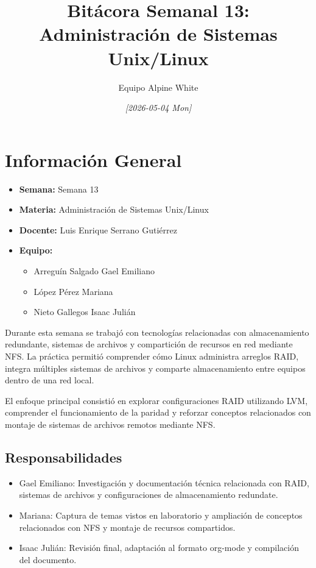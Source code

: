 \documentclass[11pt, letterpaper]{article}
\author{Equipo Alpine White}
\date{\textit{{[}2026-05-04 Mon]}}
\title{Bitácora Semanal 13: Administración de Sistemas Unix/Linux}
\begin{document}
\maketitle
\setcounter{tocdepth}{2}
\tableofcontents

\section{Información General}
\label{sec:org76c6d5e}

\begin{itemize}
\item \textbf{Semana:} Semana 13
\item \textbf{Materia:} Administración de Sistemas Unix/Linux
\item \textbf{Docente:} Luis Enrique Serrano Gutiérrez
\item \textbf{Equipo:}

\begin{itemize}
\item Arreguín Salgado Gael Emiliano
\item López Pérez Mariana
\item Nieto Gallegos Isaac Julián
\end{itemize}
\end{itemize}

Durante esta semana se trabajó con tecnologías relacionadas con almacenamiento redundante, sistemas de archivos y compartición de recursos en red mediante NFS. La práctica permitió comprender cómo Linux administra arreglos RAID, integra múltiples sistemas de archivos y comparte almacenamiento entre equipos dentro de una red local.

El enfoque principal consistió en explorar configuraciones RAID utilizando LVM, comprender el funcionamiento de la paridad y reforzar conceptos relacionados con montaje de sistemas de archivos remotos mediante NFS.
\subsection{Responsabilidades}
\label{sec:org2207b10}

\begin{itemize}
\item Gael Emiliano: Investigación y documentación técnica relacionada con RAID, sistemas de archivos y configuraciones de almacenamiento redundate.

\item Mariana: Captura de temas vistos en laboratorio y ampliación de conceptos relacionados con NFS y montaje de recursos compartidos.

\item Isaac Julián: Revisión final, adaptación al formato org-mode y compilación del documento.
\end{itemize}
\end{document}
